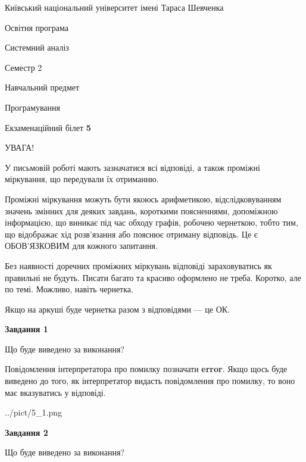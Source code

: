 \documentclass[12pt, ukrainian]{article}
\begin{document}
{{\begin {small}\par
{ \center  Київський національний університет імені Тараса Шевченка \par}
{\parbox {5 cm}{Освітня програма \hfill}{\parbox {7 cm}{Системний аналіз \hfill}}\parbox {6 cm}{\hfill Семестр 2}}\par
{\parbox {5 cm} {Навчальний предмет \hfill}\parbox {7 cm}{Програмування \hfill}\parbox {6cm}{\hfill}\par}\vspace{-7pt} \end{small}}{\center Екзаменаційний білет \No \textbf
{ 5 }\par}}
{
\begin {large}
УВАГА!

У письмовій роботі мають зазначатися всі відповіді, а також проміжні міркування, що передували їх отриманню.

Проміжні міркування можуть бути якоюсь арифметикою, відслідковуванням зна\-чень змінних для деяких завдань,
короткими поясненнями, допоміжною інформацією, що виникає під час обходу графів, робочею чернеткою,
тобто тим, що відображає хід розв’язання або пояснює отриману відповідь.
Це є ОБОВ’ЯЗКОВИМ для кожного запитання.

Без наявності доречних проміжних міркувань відповіді зараховуватись як правиль\-ні не будуть.
Писати багато та красиво оформлено не треба. Коротко, але по темі. Можли\-во, навіть чернетка.

Якщо на аркуші буде чернетка разом з відповідями --- це ОК.

\newpage

{\begin {center}\textbf{Завдання 1}\end {center}}\par
Що буде виведено за виконання?

Повідомлення інтерпретатора про помилку позначати \textbf{error}.
Якщо щось буде виведено до того, як інтерпретатор видасть повідомлення про помилку, 
то воно має вказуватись у відповіді. \par


\begin{center}
	{../pict/5_1.png}
\end{center}
\newpage

{\begin {center}\textbf{Завдання 2}\end {center}}\par
Що буде виведено за виконання?


\end{large}}
\end{document}
